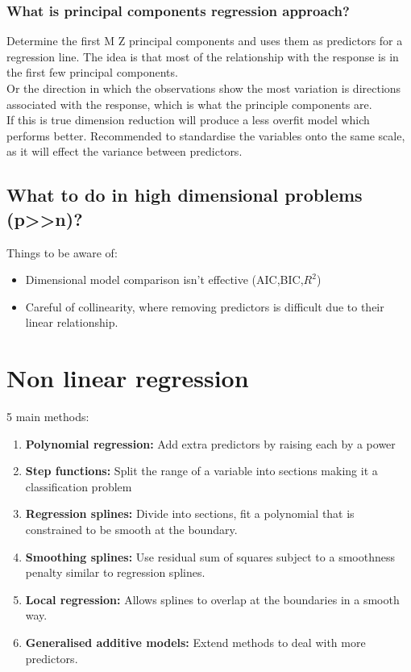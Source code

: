 \documentclass[11pt]{scrartcl} %
\begin{document}
\subsubsection{What is principal components regression approach?}

Determine the first M Z principal components and uses them as predictors for a regression line.
The idea is that most of the relationship with the response is in the first few principal components.\\

Or the direction in which the observations show the most variation is directions associated with the response,
which is what the principle components are.\\

If this is true dimension reduction will produce a less overfit model which performs better. Recommended
to standardise the variables onto the same scale, as it will effect the variance between predictors.

\subsection{What to do in high dimensional problems (p>>n)?}

Things to be aware of:

\begin{itemize}
	\item Dimensional model comparison isn't effective (AIC,BIC,\(R^2\))
	\item Careful of collinearity, where removing predictors is difficult due to their linear relationship.
\end{itemize}

\section{Non linear regression}

5 main methods:

\begin{enumerate}
	\item \textbf{Polynomial regression:} Add extra predictors by raising each by a power
	\item \textbf{Step functions:} Split the range of a variable into sections making it a classification problem
	\item \textbf{Regression splines:} Divide into sections, fit a polynomial that is constrained to be smooth
	at the boundary.
	\item \textbf{Smoothing splines:} Use residual sum of squares subject to a smoothness penalty similar to regression splines.
	\item \textbf{Local regression:} Allows splines to overlap at the boundaries in a smooth way.
	\item \textbf{Generalised additive models:} Extend methods to deal with more predictors.
\end{enumerate}
\end{document}
